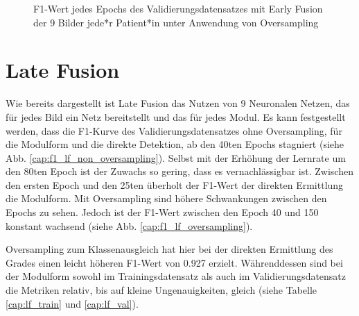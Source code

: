 \begin{figure}[b]\centering
\makebox[0pt]{}
\caption[F1-Wert jedes Epochs des Validierungsdatensatzes mit Early Fusion unter Anwendung von Oversampling]{F1-Wert jedes Epochs des Validierungsdatensatzes mit Early Fusion der 9 Bilder jede*r Patient*in unter Anwendung von Oversampling}\label{cap:f1_ef_oversampling}
\end{figure}\label{fig:f1_ef_oversampling}

\clearpage
\section{Late Fusion}\label{latefusion}

Wie bereits dargestellt ist Late Fusion das Nutzen von 9 Neuronalen Netzen, das für jedes Bild ein Netz bereitstellt und das für jedes Modul.
Es kann festgestellt werden, dass die F1-Kurve des Validierungsdatensatzes ohne Oversampling, für die Modulform und die direkte Detektion, ab den 40ten Epochs stagniert (siehe Abb. \ref{cap:f1_lf_non_oversampling}). Selbst mit der Erhöhung der Lernrate um den 80ten Epoch ist der Zuwachs so gering, dass es vernachlässigbar ist. Zwischen den ersten Epoch und den 25ten überholt der F1-Wert der direkten Ermittlung die Modulform. Mit Oversampling sind höhere Schwankungen zwischen den Epochs zu sehen. Jedoch ist der F1-Wert zwischen den Epoch 40 und 150 konstant wachsend (siehe Abb. \ref{cap:f1_lf_oversampling}).

Oversampling zum Klassenausgleich hat hier bei der direkten Ermittlung des Grades einen leicht höheren F1-Wert von 0.927 erzielt. Währenddessen sind bei der Modulform sowohl im Trainingsdatensatz als auch im Validierungsdatensatz die Metriken relativ, bis auf kleine Ungenauigkeiten, gleich (siehe Tabelle \ref{cap:lf_train} und \ref{cap:lf_val}).

